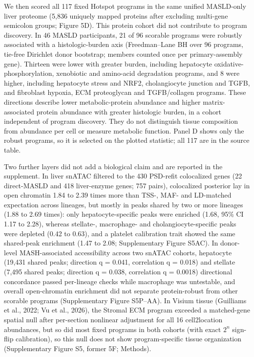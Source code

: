 We then scored all 117 fixed Hotspot programs in the same unified MASLD-only liver proteome
(5,836 uniquely mapped proteins after excluding multi-gene semicolon groups; Figure 5D). This protein cohort did not contribute to program discovery. In 46
MASLD participants, 21 of 96 scorable programs were robustly associated with a
histologic-burden axis (Freedman--Lane BH over 96 programs, tie-free Dirichlet donor bootstrap; members counted once per
primary-assembly gene). Thirteen were lower with greater burden, including
hepatocyte oxidative-phosphorylation, xenobiotic and amino-acid degradation
programs, and 8 were higher, including hepatocyte stress and NRF2, cholangiocyte
junction and TGFB, and fibroblast hypoxia, ECM proteoglycan and TGFB/collagen
programs. These directions describe lower metabolic-protein abundance and higher
matrix-associated protein abundance with greater histologic burden, in a
cohort independent of program discovery. They do not distinguish tissue
composition from abundance per cell or measure metabolic function. Panel D shows only the robust programs, so it is selected on the
plotted statistic; all 117 are in the source table.

Two further layers did not add a biological claim and are reported in the
supplement. In liver snATAC filtered to the 430 PSD-refit colocalized genes (22 direct-MASLD and 418 liver-enzyme genes; 757 pairs), colocalized posterior lay in open chromatin 1.84 to 2.39 times more than TSS-, MAF- and LD-matched expectation across lineages, but mostly in peaks shared by two or more lineages (1.88 to 2.69 times):
only hepatocyte-specific peaks were enriched (1.68, 95\% CI 1.17 to 2.28), whereas stellate-, macrophage- and cholangiocyte-specific peaks were depleted (0.42 to 0.63), and a platelet calibration trait showed
the same shared-peak enrichment (1.47 to 2.08; Supplementary Figure S5AC). In donor-level MASH-associated accessibility across two snATAC cohorts, hepatocyte (19,431 shared peaks; direction q = 0.041, correlation q = 0.018) and stellate (7,495 shared peaks; direction q = 0.038, correlation q = 0.0018) directional concordance passed per-lineage checks while macrophage was untestable, and overall open-chromatin enrichment did not separate protein-robust from other scorable programs (Supplementary Figure S5P--AA). In Visium tissue (Guilliams et al., 2022;
Vu et al., 2026), the Stromal ECM program exceeded a matched-gene spatial null
after per-section nonlinear adjustment for all 16 cell2location abundances, but so did most fixed programs in both cohorts (with exact $2^n$ sign-flip calibration), so
this null does not show program-specific tissue organization (Supplementary
Figure S5, former 5F; Methods).

